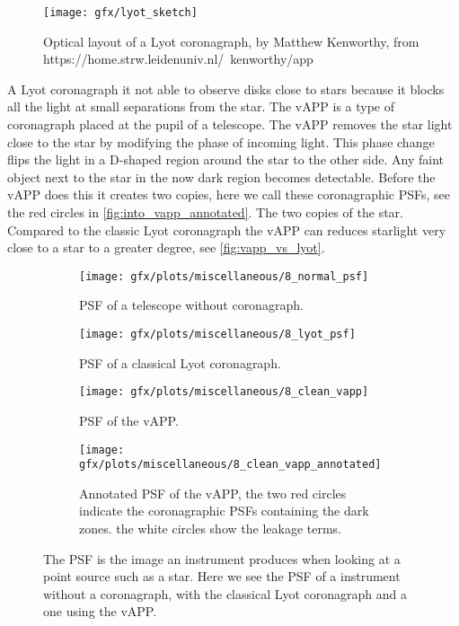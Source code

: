 \begin{figure}
    \texttt{[image: gfx/lyot\_sketch]}
    \caption{Optical layout of a Lyot coronagraph, by Matthew Kenworthy, from https://home.strw.leidenuniv.nl/~kenworthy/app}
    \label{fig:lyot_sketch}
\end {figure}

A Lyot coronagraph it not able to observe disks close to stars because it blocks all the light at small separations from the star. The \ac{vAPP} \cite{vapp_snik} is a type of coronagraph placed at the pupil of a telescope. The \ac{vAPP} removes the star light close to the star by modifying the phase of incoming light. This phase change flips the light in a D-shaped region around the star to the other side. Any faint object next to the star in the now dark region becomes detectable. Before the \ac{vAPP} does this it creates two copies, here we call these coronagraphic \acp{PSF}, see the red circles in \autoref{fig:into_vapp_annotated}. The two copies of the star. Compared to the classic Lyot coronagraph the \ac{vAPP} can reduces starlight very close to a star to a greater degree, see \autoref{fig:vapp_vs_lyot}.  

\begin{figure}[h!]
      \begin{subfigure}[t]{0.5\textwidth}
        \texttt{[image: gfx/plots/miscellaneous/8\_normal\_psf]}
        \caption{\ac{PSF} of a telescope without coronagraph.}
        \label{fig:classic_psf}
      \end{subfigure}
      \begin{subfigure}[t]{0.5 \textwidth}
        \texttt{[image: gfx/plots/miscellaneous/8\_lyot\_psf]}
        \caption{\ac{PSF} of a classical Lyot coronagraph.}
        \label{fig:lyot}
      \end{subfigure}%
      
      \begin{subfigure}[t]{0.5\textwidth}
        \texttt{[image: gfx/plots/miscellaneous/8\_clean\_vapp]}
        \caption{\ac{PSF} of the \ac{vAPP}.}
        \label{fig:into_vapp}
      \end{subfigure}
      \begin{subfigure}[t]{0.5\textwidth}
        \texttt{[image: gfx/plots/miscellaneous/8\_clean\_vapp\_annotated]}
        \caption{Annotated \ac{PSF} of the \ac{vAPP}, the two red circles indicate the coronagraphic \acp{PSF} containing the dark zones. the white circles show the leakage terms.}
        \label{fig:into_vapp_annotated}
      \end{subfigure}      
  \caption{The \ac{PSF} is the image an instrument produces when looking at a point source such as a star. Here we see the \ac{PSF} of a instrument without a coronagraph, with the classical Lyot coronagraph and a one using the \ac{vAPP}.}
  \label{fig:vapp_vs_lyot}
\end{figure}

